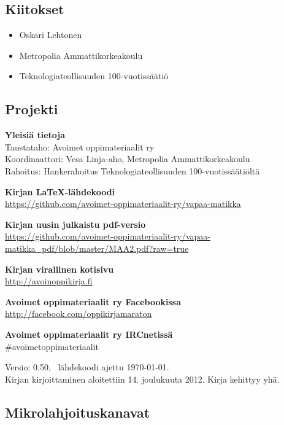 \subsection*{Kiitokset}
\begin{itemize}
\item Oskari Lehtonen %
\item Metropolia Ammattikorkeakoulu %
\item Teknologiateollisuuden 100-vuotissäätiö %
\end{itemize}



\newpage
\subsection*{Projekti}

\textbf{Yleisiä tietoja} \\
Taustataho: Avoimet oppimateriaalit ry \\
Koordinaattori: Vesa Linja-aho, Metropolia Ammattikorkeakoulu \\
Rahoitus: Hankerahoitus Teknologiateollisuuden 100-vuotissäätiöltä

\textbf{Kirjan LaTeX-lähdekoodi} \\
\url{https://github.com/avoimet-oppimateriaalit-ry/vapaa-matikka}

\textbf{Kirjan uusin julkaistu pdf-versio} \\
\url{https://github.com/avoimet-oppimateriaalit-ry/vapaa-matikka_pdf/blob/master/MAA2.pdf?raw=true}

\textbf{Kirjan virallinen kotisivu} \\
\url{http://avoinoppikirja.fi}

\textbf{Avoimet oppimateriaalit ry Facebookissa} \\
\url{http://facebook.com/oppikirjamaraton}

\textbf{Avoimet oppimateriaalit ry IRCnetissä} \\
\#avoimetoppimateriaalit

Versio: 0.50, \, lähdekoodi ajettu \today. \\
Kirjan kirjoittaminen aloitettiin 14. joulukuuta 2012. Kirja kehittyy yhä.

\subsection*{Mikrolahjoituskanavat}



